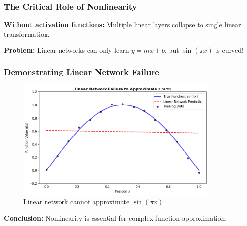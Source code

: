 \documentclass[notes]{beamer}
\begin{document}
\begin{frame}
\frametitle{The Critical Role of Nonlinearity}

\textbf{Without activation functions:} Multiple linear layers collapse to single linear transformation.


\textbf{Problem:} Linear networks can only learn $y = mx + b$, but $\sin(\pi x)$ is curved!

\end{frame}

\begin{frame}
\frametitle{Demonstrating Linear Network Failure}

\begin{figure}[ht]
	\centering
	\includegraphics[width=0.9\textwidth]{figs/linear-network-failure.png}
	\caption*{Linear network cannot approximate $\sin(\pi x)$}
\end{figure}

\textbf{Conclusion:} Nonlinearity is essential for complex function approximation.

\end{frame}
\end{document}
